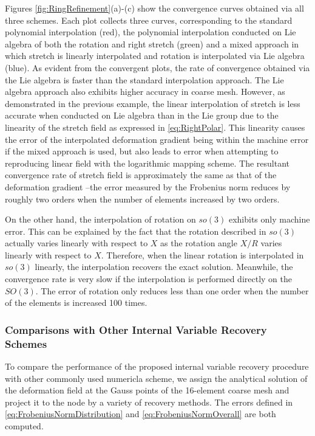 \documentclass[12pt]{article}
\begin{document}
Figures \ref{fig:RingRefinement}(a)-(c) show the convergence curves
obtained via all three schemes.  Each plot collects three curves,
corresponding to the standard polynomial interpolation (red), the
polynomial interpolation conducted on Lie algebra of both the rotation
and right stretch (green) and a mixed approach in which stretch is
linearly interpolated and rotation is interpolated via Lie algebra
(blue).  As evident from the convergent plots, the rate of convergence
obtained via the Lie algebra is faster than the standard interpolation
approach. The Lie algebra approach also exhibits higher accuracy in
coarse mesh. However, as demonstrated in the previous example, the
linear interpolation of stretch is less accurate when conducted on Lie
algebra than in the Lie group due to the linearity of the stretch
field as expressed in \eqref{eq:RightPolar}. This linearity causes the
error of the interpolated deformation gradient being within the
machine error if the mixed approach is used, but also leads to error
when attempting to reproducing linear field with the logarithmic
mapping scheme. The resultant convergence rate of stretch field is
approximately the same as that of the deformation gradient --the error
measured by the Frobenius norm reduces by roughly two orders when the
number of elements increased by two orders.

On the other hand, the interpolation of rotation on $so(3)$ exhibits
only machine error. This can be explained by the fact that the
rotation described in $so(3)$ actually varies linearly with respect to
$X$ as the rotation angle $X/R$ varies linearly with respect to
$X$. Therefore, when the linear rotation is interpolated in $so(3)$
linearly, the interpolation recovers the exact solution. Meanwhile,
the convergence rate is very slow if the interpolation is performed
directly on the $SO(3)$. The error of rotation only reduces less than
one order when the number of the elements is increased 100 times.

\subsubsection{Comparisons with Other Internal Variable Recovery Schemes}
To compare the performance of the proposed internal variable recovery procedure
with other commonly used numericla scheme, we assign the analytical solution of 
the deformation field at the Gauss points of the 16-element coarse mesh and project 
it to the node by a variety of recovery methods. The errors defined in 
\eqref{eq:FrobeniusNormDistribution} and \eqref{eq:FrobeniusNormOverall} 
are both computed. 
\end{document}

